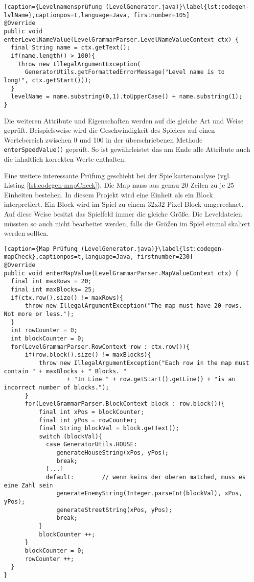 \begin{lstlisting}[caption={Levelnamensprüfung (LevelGenerator.java)}\label{lst:codegen-lvlName},captionpos=t,language=Java, firstnumber=105]
@Override
public void enterLevelNameValue(LevelGrammarParser.LevelNameValueContext ctx) {
  final String name = ctx.getText();
  if(name.length() > 100){
    throw new IllegalArgumentException(
      GeneratorUtils.getFormattedErrorMessage("Level name is to long!", ctx.getStart()));
  }
  levelName = name.substring(0,1).toUpperCase() + name.substring(1);
}
\end{lstlisting}

Die weiteren Attribute und Eigenschaften werden auf die gleiche Art und Weise geprüft. Beispielsweise wird die Geschwindigkeit des Spielers auf einen Wertebereich zwischen 0 und 100 in der überschriebenen Methode \texttt{enterSpeedValue()} geprüft. So ist gewährleistet das am Ende alle Attribute auch die inhaltlich korrekten Werte enthalten. 

Eine weitere interessante Prüfung geschieht bei der Spielkartenanalyse (vgl. Listing \ref{lst:codegen-mapCheck}).
Die Map muss aus genau 20 Zeilen zu je 25 Einheiten bestehen.
In diesem Projekt wird eine Einheit als ein Block interpretiert.
Ein Block wird im Spiel zu einem 32x32 Pixel Block umgerechnet.
Auf diese Weise besitzt das Spielfeld immer die gleiche Größe. Die Leveldateien müssten so auch nicht bearbeitet werden, falls die Größen im Spiel einmal skaliert werden sollten.

\begin{lstlisting}[caption={Map Prüfung (LevelGenerator.java)}\label{lst:codegen-mapCheck},captionpos=t,language=Java, firstnumber=230]
@Override
public void enterMapValue(LevelGrammarParser.MapValueContext ctx) {
  final int maxRows = 20;
  final int maxBlocks= 25;
  if(ctx.row().size() != maxRows){
      throw new IllegalArgumentException("The map must have 20 rows. Not more or less.");
  }
  int rowCounter = 0;
  int blockCounter = 0;
  for(LevelGrammarParser.RowContext row : ctx.row()){
      if(row.block().size() != maxBlocks){
          throw new IllegalArgumentException("Each row in the map must contain " + maxBlocks + " Blocks. "
                  + "In Line " + row.getStart().getLine() + "is an incorrect number of blocks.");
      }
      for(LevelGrammarParser.BlockContext block : row.block()){
          final int xPos = blockCounter;
          final int yPos = rowCounter;
          final String blockVal = block.getText();
          switch (blockVal){
            case GeneratorUtils.HOUSE:
               generateHouseString(xPos, yPos);
               break;
            [...]
            default:        // wenn keins der oberen matched, muss es eine Zahl sein
               generateEnemyString(Integer.parseInt(blockVal), xPos, yPos);
               generateStreetString(xPos, yPos);
               break;
          }
          blockCounter ++;
      }
      blockCounter = 0;
      rowCounter ++;
  }
}
\end{lstlisting}

